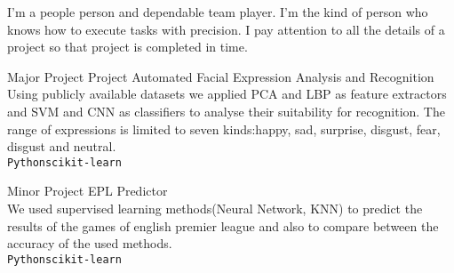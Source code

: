 \documentclass[9pt]{developercv} %
\begin{document}
\vspace{0.5cm}



\begin{minipage}[t]{0.4\textwidth} %
	\vspace{-\baselineskip} %
	I'm a people person and dependable team player. I'm the kind of person who knows how to execute tasks with precision. I pay attention to all the details of a project so that project is completed in time. 
\end{minipage}
\hfill %
\begin{minipage}[t]{0.5\textwidth} %
	\vspace{-\baselineskip} %
	\begin{barchart}{5.5}
	\end{barchart}
\end{minipage}

\begin{center}
\end{center}

\begin{entryList}
    \entry
    {
        Major Project
    }
    {
        Project Automated Facial Expression Analysis and
Recognition\\
    }
    {
    }
    {
        Using publicly available datasets we applied PCA and LBP as feature extractors and SVM and CNN as classifiers to analyse their suitability for recognition. The range of expressions is limited to seven kinds:happy, sad, surprise, disgust, fear, disgust and neutral.\\
        \texttt{Python}\slashsep\texttt{scikit-learn}
    }
    
    \entry
    {
        Minor Project
    }
    {
        EPL Predictor\\
    }
    {
    }
    {
        We used supervised learning
methods(Neural Network, KNN) to
predict the results of the games of
english premier league and also to
compare between the accuracy of
the used methods.   \\
        \texttt{Python}\slashsep\texttt{scikit-learn}
    }
\end{entryList}
\end{document}
